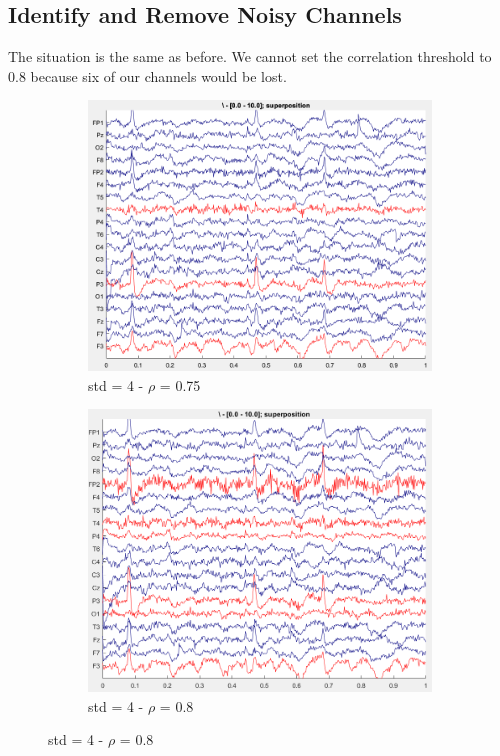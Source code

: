 \documentclass[hidelinks,12pt]{article}
\begin{document}
	\subsection{Identify and Remove Noisy Channels}
	The situation is the same as before. We cannot set the correlation threshold to 0.8 because six of our channels would be lost.
	\begin{figure}[!h]
		\centering
		\begin{subfigure}{0.45\textwidth}
			\centering
			\includegraphics[height=0.8\linewidth]{37}
			\caption{std = 4 - $\rho$ = 0.75}
		\end{subfigure}
		\hspace{1cm}
		\begin{subfigure}{0.45\textwidth}
			\centering
			\includegraphics[height=0.8\linewidth]{38}
			\caption{std = 4 - $\rho$ = 0.8}
		\end{subfigure}
	\end{figure}
	
\end{document}
